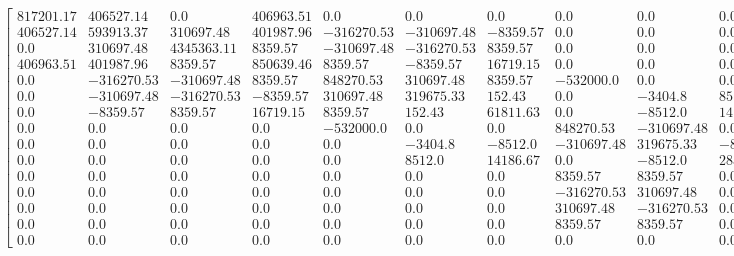 \documentclass[a4paper]{article}
\begin{document}
\begin{sideways}
{\footnotesize
\begin{equation*}\label{Ecuaciones de equilibrio gobernate de la estructura}
 \left[\begin{array}{ccccccccccccccc}817201.17 & 406527.14 & 0.0 & 406963.51 & 0.0 & 0.0 & 0.0 & 0.0 & 0.0 & 0.0 & 0.0 & 0.0 & 0.0 & 0.0 & 0.0\\406527.14 & 593913.37 & 310697.48 & 401987.96 & -316270.53 & -310697.48 & -8359.57 & 0.0 & 0.0 & 0.0 & 0.0 & 0.0 & 0.0 & 0.0 & 0.0\\0.0 & 310697.48 & 4345363.11 & 8359.57 & -310697.48 & -316270.53 & 8359.57 & 0.0 & 0.0 & 0.0 & 0.0 & 0.0 & 0.0 & 0.0 & 0.0\\406963.51 & 401987.96 & 8359.57 & 850639.46 & 8359.57 & -8359.57 & 16719.15 & 0.0 & 0.0 & 0.0 & 0.0 & 0.0 & 0.0 & 0.0 & 0.0\\0.0 & -316270.53 & -310697.48 & 8359.57 & 848270.53 & 310697.48 & 8359.57 & -532000.0 & 0.0 & 0.0 & 0.0 & 0.0 & 0.0 & 0.0 & 0.0\\0.0 & -310697.48 & -316270.53 & -8359.57 & 310697.48 & 319675.33 & 152.43 & 0.0 & -3404.8 & 8512.0 & 0.0 & 0.0 & 0.0 & 0.0 & 0.0\\0.0 & -8359.57 & 8359.57 & 16719.15 & 8359.57 & 152.43 & 61811.63 & 0.0 & -8512.0 & 14186.67 & 0.0 & 0.0 & 0.0 & 0.0 & 0.0\\0.0 & 0.0 & 0.0 & 0.0 & -532000.0 & 0.0 & 0.0 & 848270.53 & -310697.48 & 0.0 & 8359.57 & -316270.53 & 310697.48 & 8359.57 & 0.0\\0.0 & 0.0 & 0.0 & 0.0 & 0.0 & -3404.8 & -8512.0 & -310697.48 & 319675.33 & -8512.0 & 8359.57 & 310697.48 & -316270.53 & 8359.57 & 0.0\\0.0 & 0.0 & 0.0 & 0.0 & 0.0 & 8512.0 & 14186.67 & 0.0 & -8512.0 & 28373.33 & 0.0 & 0.0 & 0.0 & 0.0 & 0.0\\0.0 & 0.0 & 0.0 & 0.0 & 0.0 & 0.0 & 0.0 & 8359.57 & 8359.57 & 0.0 & 33438.29 & -8359.57 & -8359.57 & 16719.15 & 0.0\\0.0 & 0.0 & 0.0 & 0.0 & 0.0 & 0.0 & 0.0 & -316270.53 & 310697.48 & 0.0 & -8359.57 & 593913.37 & -310697.48 & 401987.96 & 406527.14\\0.0 & 0.0 & 0.0 & 0.0 & 0.0 & 0.0 & 0.0 & 310697.48 & -316270.53 & 0.0 & -8359.57 & -310697.48 & 4345363.11 & -8359.57 & 0.0\\0.0 & 0.0 & 0.0 & 0.0 & 0.0 & 0.0 & 0.0 & 8359.57 & 8359.57 & 0.0 & 16719.15 & 401987.96 & -8359.57 & 850639.46 & 406963.51\\0.0 & 0.0 & 0.0 & 0.0 & 0.0 & 0.0 & 0.0 & 0.0 & 0.0 & 0.0 & 0.0 & 406527.14 & 0.0 & 406963.51 & 817201.17\end{array}\right]

\end{equation*}}
\end{sideways}
\end{document}

